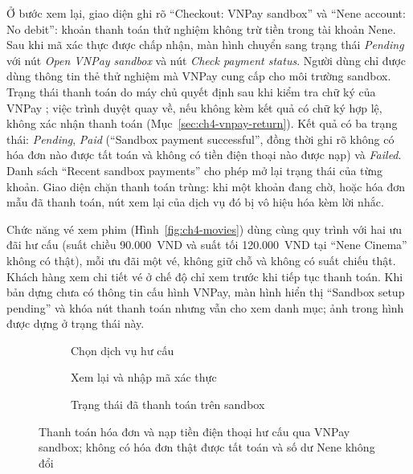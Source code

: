 Ở bước xem lại, giao diện ghi rõ ``Checkout: VNPay sandbox'' và ``Nene account: No debit'': khoản thanh toán thử nghiệm không trừ tiền trong tài khoản Nene. Sau khi mã xác thực được chấp nhận, màn hình chuyển sang trạng thái \textit{Pending} với nút \textit{Open VNPay sandbox} và nút \textit{Check payment status}. Người dùng chỉ được dùng thông tin thẻ thử nghiệm mà VNPay cung cấp cho môi trường sandbox. Trạng thái thanh toán do máy chủ quyết định sau khi kiểm tra chữ ký của VNPay \parencite{ch2-vnpay-pay}; việc trình duyệt quay về, nếu không kèm kết quả có chữ ký hợp lệ, không xác nhận thanh toán (Mục~\ref{sec:ch4-vnpay-return}). Kết quả có ba trạng thái: \textit{Pending}, \textit{Paid} (``Sandbox payment successful'', đồng thời ghi rõ không có hóa đơn nào được tất toán và không có tiền điện thoại nào được nạp) và \textit{Failed}. Danh sách ``Recent sandbox payments'' cho phép mở lại trạng thái của từng khoản. Giao diện chặn thanh toán trùng: khi một khoản đang chờ, hoặc hóa đơn mẫu đã thanh toán, nút xem lại của dịch vụ đó bị vô hiệu hóa kèm lời nhắc.

Chức năng vé xem phim (Hình~\ref{fig:ch4-movies}) dùng cùng quy trình với hai ưu đãi hư cấu (suất chiều 90.000~VND và suất tối 120.000~VND tại ``Nene Cinema'' không có thật), mỗi ưu đãi một vé, không giữ chỗ và không có suất chiếu thật. Khách hàng xem chi tiết vé ở chế độ chỉ xem trước khi tiếp tục thanh toán. Khi bản dựng chưa có thông tin cấu hình VNPay, màn hình hiển thị ``Sandbox setup pending'' và khóa nút thanh toán nhưng vẫn cho xem danh mục; ảnh trong hình được dựng ở trạng thái này.

\begin{figure}[H]
\centering
\begin{subfigure}[t]{0.31\textwidth}
  \centering
  \caption{Chọn dịch vụ hư cấu}
  \label{fig:ch4-bills-services}
\end{subfigure}\hfill
\begin{subfigure}[t]{0.31\textwidth}
  \centering
  \caption{Xem lại và nhập mã xác thực}
  \label{fig:ch4-bills-review}
\end{subfigure}\hfill
\begin{subfigure}[t]{0.31\textwidth}
  \centering
  \caption{Trạng thái đã thanh toán trên sandbox}
  \label{fig:ch4-bills-paid}
\end{subfigure}
\caption{Thanh toán hóa đơn và nạp tiền điện thoại hư cấu qua VNPay sandbox; không có hóa đơn thật được tất toán và số dư Nene không đổi}
\label{fig:ch4-bills}
\end{figure}


